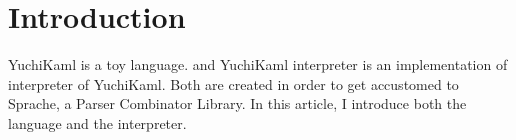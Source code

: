 \section{Introduction}

YuchiKaml is a toy language. and YuchiKaml interpreter is an implementation of interpreter of YuchiKaml.
Both are created in order to get accustomed to Sprache, a \cs Parser Combinator Library.
In this article, I introduce both the language and the interpreter.
